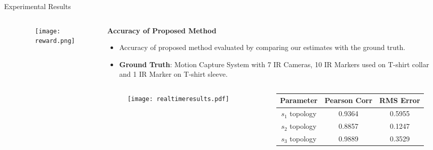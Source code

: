 \documentclass[final,hyperref={pdfpagelabels=false}]{beamer}
\begin{document}
\begin{frame}[t]
\begin{alertblock}{Experimental Results}
\begin{columns}[t]
\begin{column}{0.49\linewidth}
\begin{columns}[t]
\begin{column}{0.49\linewidth}
\end{column}

\begin{column}{0.49\linewidth}

\begin{figure}
\centering
\texttt{[image: reward.png]}
\end{figure}

\end{column}

\end{columns}

\end{column}

\begin{column}{0.49\linewidth}

\centering \textbf{Accuracy of Proposed Method}

\begin{itemize}
\item Accuracy of proposed method evaluated by comparing our estimates with the ground truth.
\vspace{3mm}
\item \textbf{Ground Truth}: Motion Capture System with 7 IR Cameras, 10 IR Markers used on T-shirt collar and 1 IR Marker on T-shirt sleeve.
\end{itemize}

\begin{columns}[t]

\begin{column}{0.59\linewidth}

\begin{figure}
\centering
\texttt{[image: realtimeresults.pdf]}
\end{figure}

\end{column}

\begin{column}{0.39\linewidth}

\begin{table}
\centering
\begin{center}
\small
\begin{tabular}{ccc}
\toprule
Parameter & Pearson Corr & RMS Error\\[0.2cm]
\midrule
$s_1$ topology & 0.9364 & 0.5955\\
$s_2$ topology & 0.8857 & 0.1247\\
$s_3$ topology & 0.9889 & 0.3529\\
\bottomrule
\end{tabular}
\end{center}
\end{table}


\end{column}
\end{columns}
\end{column}
\end{columns}
\end{alertblock}
\end{frame}
\end{document}
